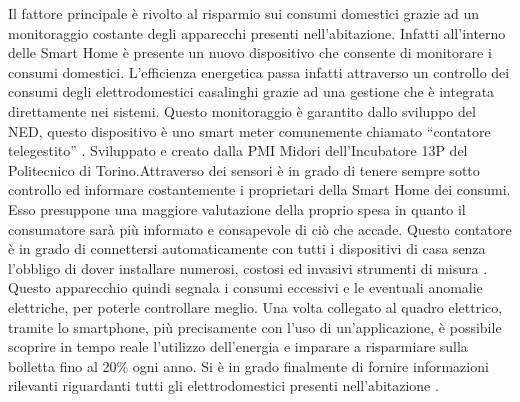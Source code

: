 Il fattore principale è rivolto al risparmio sui consumi domestici grazie ad un monitoraggio costante degli apparecchi presenti nell’abitazione. 
Infatti all’interno delle Smart Home è presente un nuovo dispositivo che consente di monitorare i consumi domestici. L’efficienza energetica passa infatti attraverso un controllo dei consumi degli elettrodomestici casalinghi grazie ad una gestione che è integrata direttamente nei sistemi. Questo monitoraggio è garantito dallo sviluppo del NED, questo dispositivo è uno smart meter comunemente chiamato “contatore telegestito” . Sviluppato e creato dalla PMI Midori dell’Incubatore 13P del Politecnico di Torino.Attraverso dei sensori è in grado di tenere sempre sotto controllo ed informare costantemente i proprietari della Smart Home dei consumi. Esso presuppone una maggiore valutazione della proprio spesa in quanto il consumatore sarà più informato e consapevole di ciò che accade. Questo contatore è in grado di connettersi automaticamente con tutti i dispositivi di casa senza l’obbligo di dover installare numerosi, costosi ed invasivi strumenti di misura . Questo apparecchio quindi segnala i consumi eccessivi e le eventuali anomalie elettriche, per poterle controllare meglio. Una volta collegato al quadro elettrico, tramite lo smartphone, più precisamente con l’uso di un’applicazione, è possibile scoprire in tempo reale l’utilizzo dell’energia e imparare a risparmiare sulla bolletta fino al 20\% ogni anno. Si è in grado finalmente di fornire informazioni rilevanti riguardanti tutti gli elettrodomestici presenti nell’abitazione .
